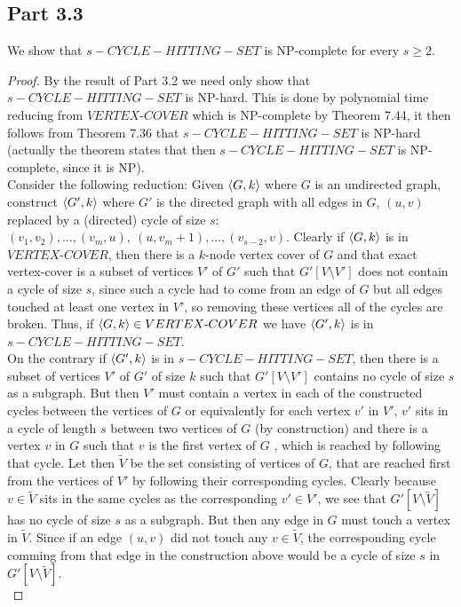 \documentclass[a4paper,11pt]{article}
\newcommand{\tm}{\text{-}}
\numberwithin{equation}{section}
\begin{document}
	\subsection*{Part 3.3}
	We show that $ s-C Y C L E-H I T T I N G-S E T $ is NP-complete for every $ s\geq 2 $.
	\begin{proof}
		By the result of Part 3.2 we need only show that $ s-C Y C L E-H I T T I N G-S E T $ is NP-hard. This is done by polynomial time reducing from $ VERTEX\tm COVER $ which is NP-complete by Theorem 7.44, it then follows from Theorem 7.36 that $ s-C Y C L E-H I T T I N G-S E T $ is NP-hard (actually the theorem states that then $ s-C Y C L E-H I T T I N G-S E T $ is NP-complete, since it is NP).\\
		Consider the following reduction: Given $ \braket{G,k} $ where $ G $ is an undirected graph, construct $ \braket{G',k} $ where $ G' $ is the directed graph with all edges in $ G $, $ (u,v) $ replaced by a (directed) cycle of size $ s $: $ (v_1,v_2),...,(v_m,u),\ (u,v_m+1),...,(v_{s-2},v) $. Clearly if $ \braket{G,k} $ is in $ VERTEX\tm COVER $, then there is a $ k $-node vertex cover of $ G $ and that exact vertex-cover is a subset of vertices $ V' $ of $ G' $ such that $ G'[V\setminus V'] $ does not contain a cycle of size $ s $, since such a cycle had to come from an edge of $ G $ but all edges touched at least one vertex in $ V' $, so removing these vertices all of the cycles are broken. Thus, if $ \braket{G,k}\in VERTEX\tm COVER $ we have $ \braket{G',k} $ is in $ s-C Y C L E-H I T T I N G-S E T  $.\\
		On the contrary if $ \braket{G',k} $ is in $ s-C Y C L E-H I T T I N G-S E T $, then there is a subset of vertices $ V' $ of $ G' $ of size $ k $ such that $ G'[V\setminus V'] $ contains no cycle of size $ s $ as a subgraph. But then $ V' $ must contain a vertex in each of the constructed cycles between the vertices of $ G $ or equivalently for each vertex $ v' $ in $ V' $, $ v' $ sits in a cycle of length $ s $ between two vertices of $ G $ (by construction) and there is a vertex $ v $ in $ G $ such that $ v $ is the first vertex of $ G $ , which is reached by following that cycle. Let then $ \tilde{V} $ be the set consisting of vertices of $ G $, that are reached first from the vertices of $ V' $ by following their corresponding cycles. Clearly because $ v\in \tilde{V} $ sits in the same cycles as the corresponding $ v'\in V' $, we see that $ G'[V\setminus\tilde{V}] $ has no cycle of size $ s $ as a subgraph. But then any edge in $ G $ must touch a vertex in $ \tilde{V} $. Since if an edge $ (u,v) $ did not touch any $ v\in\tilde{V} $, the corresponding cycle comming from that edge in the construction above would be a cycle of size $ s $ in $ G'[V\setminus \tilde{V}] $.\\

\end{proof}
\end{document}
